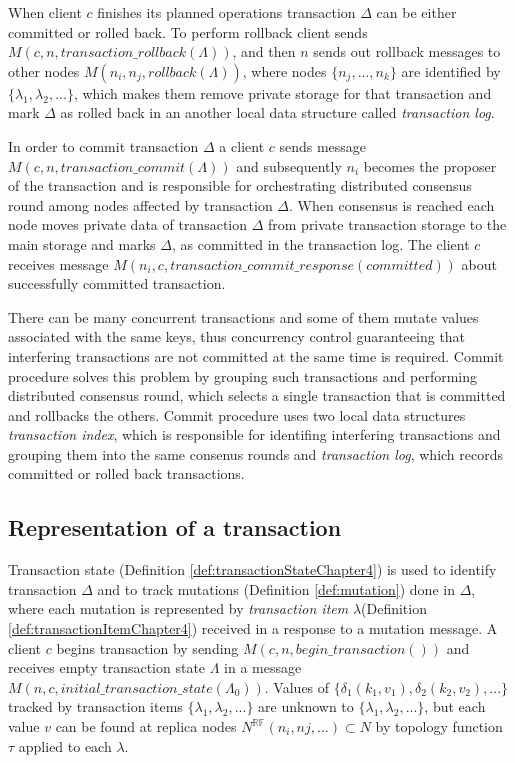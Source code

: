 \documentclass[runningheads,a4paper]{llncs}
\newcommand{\transaction}{$\Delta$\xspace}
\newcommand{\beginTransactionMessage}{$\mathit{M}(c, n, \mathit{begin\_transaction}())$\xspace}
\newcommand{\initialTxStateMessage}{$\mathit{M}(n, c, \mathit{initial\_transaction\_state}(\Lambda_{0}))$\xspace}
\newcommand{\txRollbackMessage}{$\mathit{M}(c,n,\mathit{transaction\_rollback}(\Lambda))$\xspace}
\newcommand{\rollbackMessage}{$\mathit{M}(n_{i}, n_{j}, \mathit{rollback}(\Lambda))$\xspace}
\newcommand{\txCommitMessage}{$\mathit{M}(c,n, \mathit{transaction\_commit}(\Lambda))$\xspace}
\newcommand{\txCommitResonseMessage}{$\mathit{M}(n_{i},c,\mathit{transaction\_commit\_response}(committed))$\xspace}
\newcommand{\topology}{$\tau$\xspace}
\newcommand{\mutationsFull}{$\{\delta_{1}(k_1, v_1), \delta_{2}(k_2, v_2), ...\}$\xspace}
\newcommand{\txItem}{$\lambda$\xspace}
\newcommand{\txItems}{$\{\lambda_{1}, \lambda_{2}, ...\}$\xspace}
\newcommand{\txState}{$\Lambda$\xspace}
\newcommand{\client}{$c$\xspace}
\newcommand{\node}[1]{$n_{#1}$\xspace}
\begin{document}
When client \client finishes its planned operations transaction \transaction can be either committed or rolled back. To perform rollback client sends \txRollbackMessage, and then $n$ sends out rollback messages to other nodes \rollbackMessage, where nodes $\{n_j,...,n_k\}$ are identified by \txItems, which 
makes them remove private storage for that transaction
and mark \transaction as rolled back in 
an another local data structure called \emph{transaction log}.

In order to commit transaction \transaction a client \client sends message \txCommitMessage and subsequently \node{i} becomes the proposer of the transaction and is responsible for orchestrating distributed consensus round among nodes affected by transaction \transaction.
When consensus is reached each node moves private data of transaction \transaction from private transaction storage to the main storage and marks \transaction, as committed in the transaction log. The client \client receives message \txCommitResonseMessage about successfully committed transaction.

There can be many concurrent transactions and some of them mutate values associated with the same keys, thus concurrency control guaranteeing that interfering transactions are not committed at the same time is required. Commit procedure solves this problem by grouping such transactions and performing distributed consensus round, which selects a single transaction that is committed and rollbacks the others.
Commit procedure uses two local data structures \emph{transaction index}, which is responsible for identifing interfering transactions and grouping them into the same consenus rounds and \emph{transaction log}, which records committed or rolled back transactions.


\subsection{Representation of a transaction}
Transaction state (Definition \ref{def:transactionStateChapter4}) is used to identify transaction \transaction and to
 track mutations (Definition \ref{def:mutation}) done in \transaction, where each mutation is represented by
 \emph{transaction item} \txItem (Definition \ref{def:transactionItemChapter4}) received in a response to a mutation message. A client \client begins transaction by sending \beginTransactionMessage and receives empty transaction state \txState in a message  \initialTxStateMessage.
Values of \mutationsFull tracked by transaction items \txItems are unknown to \txItems, but each value $v$ can be found at replica nodes
$N^{\mathbb{RF}}(n_{i},n{j},...)\subset \mathit{N}$ by topology function \topology applied to each \txItem.
\end{document}
